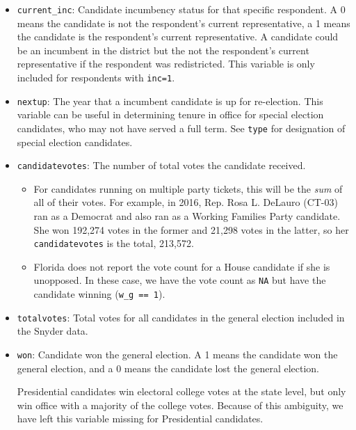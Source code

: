 \documentclass[12pt]{article}
\begin{document}
\begin{itemize}[leftmargin=*]
\item \texttt{current\_inc}: Candidate incumbency status for that specific respondent. A 0 means the candidate is not the respondent's current representative, a 1 means the candidate is the respondent's current representative. A candidate could be an incumbent in the district but the not the respondent's current representative if the respondent was redistricted. This variable is only included for respondents with \texttt{inc=1}.

\item \texttt{nextup}: The year that a incumbent candidate is up for re-election. This variable can be useful in determining tenure in office for special election candidates, who may not have served a full term. See \texttt{type} for designation of special election candidates. 		
			
\item \texttt{candidatevotes}: The number of total votes the candidate received. 
\begin{itemize}
\item For candidates running on multiple party tickets, this will be the \emph{sum} of all of their votes.  For example, in 2016, Rep. Rosa L. DeLauro (CT-03) ran as a Democrat and also ran as a Working Families Party candidate. She won 192,274 votes in the former and 21,298 votes in the latter, so her \texttt{candidatevotes} is the total, 213,572.
\item  Florida does not report the vote count for a House candidate if she is unopposed. In these case, we have the vote count as \texttt{NA} but have the candidate winning (\texttt{w\_g == 1}).
\end{itemize}
				

\item \texttt{totalvotes}: Total votes for all candidates in the general election included in the Snyder data. 

\item \texttt{won}: Candidate won the general election. A 1 means the candidate won the general election, and a 0 means the candidate lost the general election. 

Presidential candidates win electoral college votes at the state level, but only win office with a majority of the college votes. Because of this ambiguity, we have left this variable missing for Presidential candidates.


\end{itemize}
\end{document}
